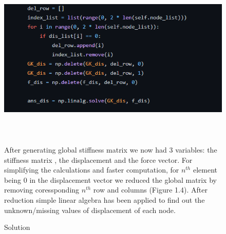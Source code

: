 \documentclass[a4paper,12pt]{report}
\begin{document}
\begin{figure}
\includegraphics[width = 14cm, height = 8cm]{solve}
\caption{Solution}
\vspace{1cm}

After generating global stiffness matrix we now had 3 variables: the stiffness matrix , the displacement and the force vector. For simplifying the calculations and faster computation, for $n^{th}$ element being 0 in the displacement vector we reduced the global matrix by removing coressponding $n^{th}$ row and columns (Figure 1.4). After reduction simple linear algebra has been applied to find out the unknown/missing values of displacement of each node. 
\end{figure}
\end{document}
